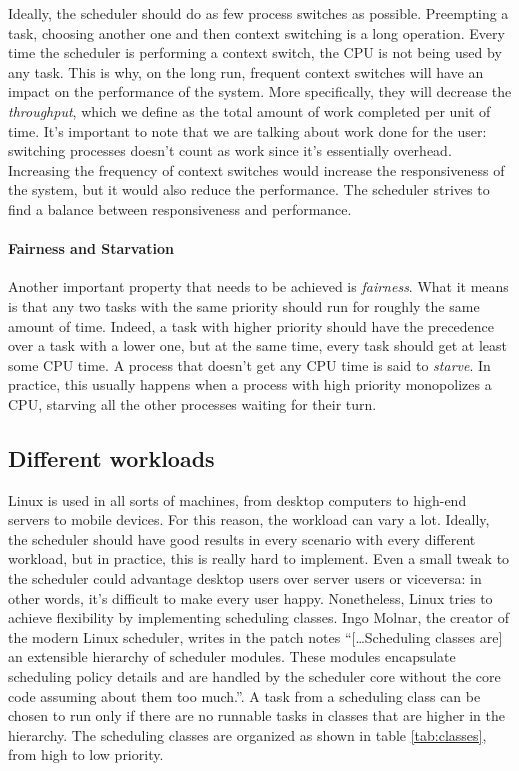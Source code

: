Ideally, the scheduler should do as few process switches as possible. Preempting a task, choosing another one and then context switching is a long operation. Every time the scheduler is performing a context switch, the CPU is not being used by any task. This is why, on the long run, frequent context switches will have an impact on the performance of the system. More specifically, they will decrease the \textit{throughput}, which we define as the total amount of work completed per unit of time. It's important to note that we are talking about work done for the user: switching processes doesn't count as work since it's essentially overhead. Increasing the frequency of context switches would increase the responsiveness of the system, but it would also reduce the performance. The scheduler strives to find a balance between responsiveness and performance.

\paragraph{Fairness and Starvation}
Another important property that needs to be achieved is \textit{fairness}. What it means is that any two tasks with the same priority should run for roughly the same amount of time. Indeed, a task with higher priority should have the precedence over a task with a lower one, but at the same time, every task should get at least some CPU time. A process that doesn't get any CPU time is said to \textit{starve}. In practice, this usually happens when a process with high priority monopolizes a CPU, starving all the other processes waiting for their turn.

\subsection{Different workloads}  %
Linux is used in all sorts of machines, from desktop computers to high-end servers to mobile devices. For this reason, the workload can vary a lot. Ideally, the scheduler should have good results in every scenario with every different workload, but in practice, this is really hard to implement. Even a small tweak to the scheduler could advantage desktop users over server users or viceversa: in other words, it's difficult to make every user happy.\cite{nice_design} Nonetheless, Linux tries to achieve flexibility by implementing scheduling classes. Ingo Molnar, the creator of the modern Linux scheduler, writes in the patch notes 
``[\dots Scheduling classes are] an extensible hierarchy of
scheduler modules. These modules encapsulate scheduling policy
details and are handled by the scheduler core without the core
code assuming about them too much.''\cite{ingo}. 
A task from a scheduling class can be chosen to run only if there are no runnable tasks in classes that are higher in the hierarchy. The scheduling classes are organized as shown in table \ref{tab:classes}, from high to low priority.

